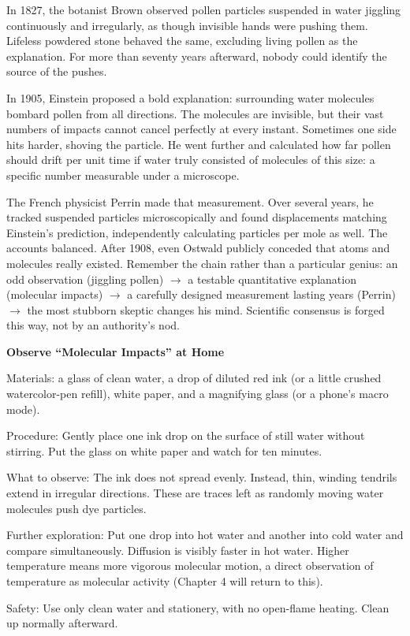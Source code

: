 \begin{zhengju}
In 1827, the botanist Brown observed pollen particles suspended in water jiggling continuously and irregularly, as though invisible hands were pushing them. Lifeless powdered stone behaved the same, excluding living pollen as the explanation. For more than seventy years afterward, nobody could identify the source of the pushes.

In 1905, Einstein proposed a bold explanation: surrounding water molecules bombard pollen from all directions. The molecules are invisible, but their vast numbers of impacts cannot cancel perfectly at every instant. Sometimes one side hits harder, shoving the particle. He went further and calculated how far pollen should drift per unit time if water truly consisted of molecules of this size: a specific number measurable under a microscope.

The French physicist Perrin made that measurement. Over several years, he tracked suspended particles microscopically and found displacements matching Einstein's prediction, independently calculating particles per mole as well. The accounts balanced. After 1908, even Ostwald publicly conceded that atoms and molecules really existed. Remember the chain rather than a particular genius: an odd observation (jiggling pollen) $\rightarrow$ a testable quantitative explanation (molecular impacts) $\rightarrow$ a carefully designed measurement lasting years (Perrin) $\rightarrow$ the most stubborn skeptic changes his mind. Scientific consensus is forged this way, not by an authority's nod.
\end{zhengju}

\begin{shiyan}
\textbf{Observe ``Molecular Impacts'' at Home}

Materials: a glass of clean water, a drop of diluted red ink (or a little crushed watercolor-pen refill), white paper, and a magnifying glass (or a phone's macro mode).

Procedure: Gently place one ink drop on the surface of still water without stirring. Put the glass on white paper and watch for ten minutes.

What to observe: The ink does not spread evenly. Instead, thin, winding tendrils extend in irregular directions. These are traces left as randomly moving water molecules push dye particles.

Further exploration: Put one drop into hot water and another into cold water and compare simultaneously. Diffusion is visibly faster in hot water. Higher temperature means more vigorous molecular motion, a direct observation of temperature as molecular activity (Chapter 4 will return to this).

Safety: Use only clean water and stationery, with no open-flame heating. Clean up normally afterward.
\end{shiyan}

